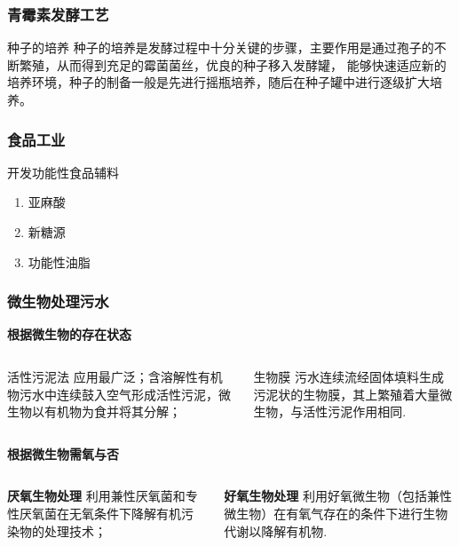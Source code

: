 \documentclass[10pt,aspectratio=43,mathserif]{beamer}
\begin{document}
    \begin{frame}
    \frametitle{\textbf{青霉素发酵工艺}}
        \begin{block}{种子的培养}
            种子的培养是发酵过程中十分关键的步骤，主要作用是通过孢子的不断繁殖，从而得到充足的霉菌菌丝，优良的种子移入发酵罐，
            能够快速适应新的培养环境，种子的制备一般是先进行摇瓶培养，随后在种子罐中进行逐级扩大培养。
        \end{block}
    \end{frame}

       \begin{frame}
        \frametitle{食品工业}
        \begin{block}{开发功能性食品辅料}
            \begin{enumerate}
                \item 亚麻酸
                \item 新糖源
                \item 功能性油脂
            \end{enumerate}
        \end{block}
        \end{frame}

		\begin{frame}
		  \frametitle{微生物处理污水}
          \textbf{根据微生物的存在状态}
          \begin{columns}[c]
    		  \begin{block}{活性污泥法}
                  应用最广泛；含溶解性有机物污水中连续鼓入空气形成活性污泥，微生物以有机物为食并将其分解；
              \end{block}
              \begin{block}{生物膜}
                污水连续流经固体填料生成污泥状的生物膜，其上繁殖着大量微生物，与活性污泥作用相同.
              \end{block}
          \end{columns}
      
          \textbf{根据微生物需氧与否}
          \begin{columns}[c]
              \begin{block}{\textbf{厌氧生物处理}}
                  利用兼性厌氧菌和专性厌氧菌在无氧条件下降解有机污染物的处理技术；
              \end{block}
              \begin{block}{\textbf{好氧生物处理}}
                  利用好氧微生物（包括兼性微生物）在有氧气存在的条件下进行生物代谢以降解有机物.
              \end{block}
          \end{columns}
		\end{frame}
\end{document}
